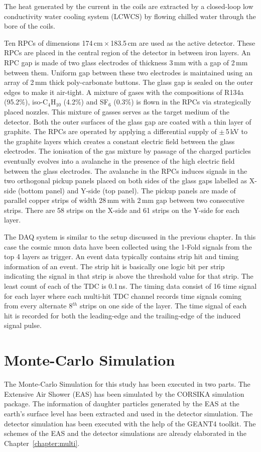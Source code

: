 The heat generated by the current in the
coils are extracted by a closed-loop low conductivity water cooling
system (LCWCS) by flowing chilled water through the bore of the coils.

Ten RPCs of dimensions 174\,cm\,$\times$\,183.5\,cm are used as the
active detector. These RPCs are placed in the central region of
the detector in between iron layers.
An RPC gap is made of two glass electrodes of thickness 3\,mm with
a gap of 2\,mm between them. Uniform gap between these two electrodes
is maintained using an array of 2\,mm thick poly-carbonate buttons.
The glass gap is sealed on the outer edges to make it air-tight.
A mixture of gases with the compositions of R134a (95.2\%),
iso-C$_4$H$_{10}$ (4.2\%) and SF$_6$ (0.3\%) is flown in the RPCs
via strategically placed nozzles. This mixture of gasses serves as the
target medium of the detector.
Both the outer surfaces of the glass gap are coated with a thin layer
of graphite. The RPCs are operated by applying a differential supply of
$\pm$\,5\,kV to the graphite layers which creates a constant electric
field between the glass electrodes. The ionisation of the gas mixture
by passage of the charged particles eventually evolves into a
avalanche in the presence of the high electric field between the glass
electrodes. The avalanche in the RPCs induces signals in the two
orthogonal pickup panels placed on both sides of the glass gaps
labelled as X-side (bottom panel) and Y-side (top panel). The pickup panels
  are made of parallel
copper strips of width 28\,mm with 2\,mm gap between two consecutive
strips. There are 58 strips on the X-side and 61 strips on the %
Y-side for each layer.

The DAQ system is similar to the setup discussed in the previous
chapter. In this case the cosmic muon data have been collected using
the 1-Fold signals from the top 4 layers as trigger.
An event data typically contains strip hit and timing information
of an event. The strip hit is basically one logic bit per strip
indicating the signal in that strip is above the threshold value
for that strip. The least count of each of the TDC is 0.1\,ns.
The timing data consist of 16 time signal for
each layer where each multi-hit TDC channel records time signals
coming from every alternate 8$^{th}$ strips on one side of the layer.
The time signal of each hit is recorded for both the leading-edge and
the trailing-edge of the induced signal pulse.

\section{Monte-Carlo Simulation}
The Monte-Carlo Simulation for this study has been executed in
two parts. The Extensive Air Shower (EAS) has been simulated
by the CORSIKA simulation package\cite{corsika763}. The information
of daughter particles generated by the EAS at the earth's surface
level has been extracted and used in the detector simulation.
The detector simulation has been executed with the help
of the GEANT4 toolkit\cite{geant4}. The schemes of the EAS and the
detector simulations are already elaborated in the
Chapter~\ref{chapter:multi}.

